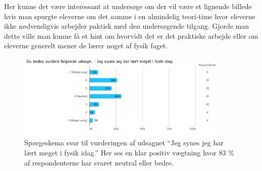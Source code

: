Her kunne det være interessant at undersøge om der vil være et lignende billede hvis man spurgte eleverne om det samme i en almindelig teori-time hvor eleverne ikke nødvendigvis arbejder paktisk med den undersøgende tilgang. Gjorde man dette ville man kunne få et hint om hvorvidt det er det praktiske arbejde eller om eleverne generelt mener de lærer noget af fysik faget.
\begin{figure}[h!]
	\centering
	\includegraphics[width=0.9\textwidth]{Figs/Sp1}
	\caption{Spørgeskema svar til vurderingen af udsagnet ``Jeg synes jeg har lært meget i fysik idag.'' Her ses en klar positiv vægtning hvor 83 \% af respondenterne har svaret neutral eller bedre.}
	\label{fig:4.1.b}
\end{figure}



%
%
%

